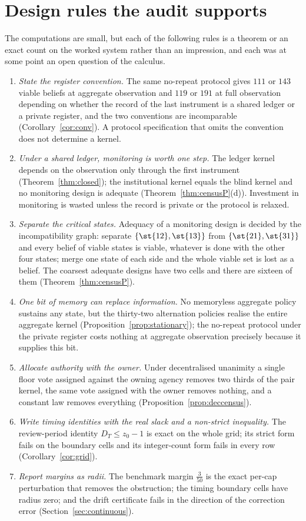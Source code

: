\section{Design rules the audit supports}\label{sec:rules}

The computations are small, but each of the following rules is a theorem or an exact count on the worked system rather than an impression, and each was at some point an open question of the calculus.

\begin{enumerate}[leftmargin=2em,itemsep=2pt]
\item \emph{State the register convention.} The same no-repeat protocol gives $111$ or $143$ viable beliefs at aggregate observation and $119$ or $191$ at full observation depending on whether the record of the last instrument is a shared ledger or a private register, and the two conventions are incomparable (Corollary~\ref{cor:conv}). A protocol specification that omits the convention does not determine a kernel.
\item \emph{Under a shared ledger, monitoring is worth one step.} The ledger kernel depends on the observation only through the first instrument (Theorem~\ref{thm:closed}); the institutional kernel equals the blind kernel and no monitoring design is adequate (Theorem~\ref{thm:censusP}(d)). Investment in monitoring is wasted unless the record is private or the protocol is relaxed.
\item \emph{Separate the critical states.} Adequacy of a monitoring design is decided by the incompatibility graph: separate $\{\st{12},\st{13}\}$ from $\{\st{21},\st{31}\}$ and every belief of viable states is viable, whatever is done with the other four states; merge one state of each side and the whole viable set is lost as a belief. The coarsest adequate designs have two cells and there are sixteen of them (Theorem~\ref{thm:censusP}).
\item \emph{One bit of memory can replace information.} No memoryless aggregate policy sustains any state, but the thirty-two alternation policies realise the entire aggregate kernel (Proposition~\ref{prop:stationary}); the no-repeat protocol under the private register costs nothing at aggregate observation precisely because it supplies this bit.
\item \emph{Allocate authority with the owner.} Under decentralised unanimity a single floor vote assigned against the owning agency removes two thirds of the pair kernel, the same vote assigned with the owner removes nothing, and a constant law removes everything (Proposition~\ref{prop:deccensus}).
\item \emph{Write timing identities with the real slack and a non-strict inequality.} The review-period identity $D_T\le z_0-1$ is exact on the whole grid; its strict form fails on the boundary cells and its integer-count form fails in every row (Corollary~\ref{cor:grid}).
\item \emph{Report margins as radii.} The benchmark margin $\tfrac3{50}$ is the exact per-cap perturbation that removes the obstruction; the timing boundary cells have radius zero; and the drift certificate fails in the direction of the correction error (Section~\ref{sec:continuous}).
\end{enumerate}
